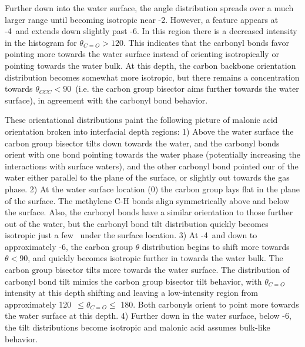 Further down into the water surface, the angle distribution spreads over a much larger range until becoming isotropic near -2\angs. However, a feature appears at -4\angs~and extends down slightly past -6\angs. In this region there is a decreased intensity in the histogram for $\theta_{C=O} > 120$\textdegree. This indicates that the carbonyl bonds favor pointing more towards the water surface instead of orienting isotropically or pointing towards the water bulk. At this depth, the carbon backbone orientation distribution becomes somewhat more isotropic, but there remains a concentration towards $\theta_{CCC} < 90$\textdegree~(i.e. the carbon group bisector aims further towards the water surface), in agreement with the carbonyl bond behavior.

These orientational distributions paint the following picture of malonic acid orientation broken into interfacial depth regions: 1) Above the water surface the carbon group bisector tilts down towards the water, and the carbonyl bonds orient with one bond pointing towards the water phase (potentially increasing the interactions with surface waters), and the other carbonyl bond pointed our of the water either parallel to the plane of the surface, or slightly out towards the gas phase. 2) At the water surface location (0\angs) the carbon group lays flat in the plane of the surface. The methylene C-H bonds align symmetrically above and below the surface. Also, the carbonyl bonds have a similar orientation to those further out of the water, but the carbonyl bond tilt distribution quickly becomes isotropic just a few \angs~under the surface location. 3) At -4\angs~and down to approximately -6\angs, the carbon group $\theta$ distribution begins to shift more towards $\theta<90$\textdegree, and quickly becomes isotropic further in towards the water bulk. The carbon group bisector tilts more towards the water surface. The distribution of carbonyl bond tilt mimics the carbon group bisector tilt behavior, with $\theta_{C=O}$ intensity at this depth shifting and leaving a low-intensity region from approximately 120\textdegree~$\le \theta_{C=O} \le$ 180\textdegree. Both carbonyls orient to point more towards the water surface at this depth. 4) Further down in the water surface, below -6\angs, the tilt distributions become isotropic and malonic acid assumes bulk-like behavior.
